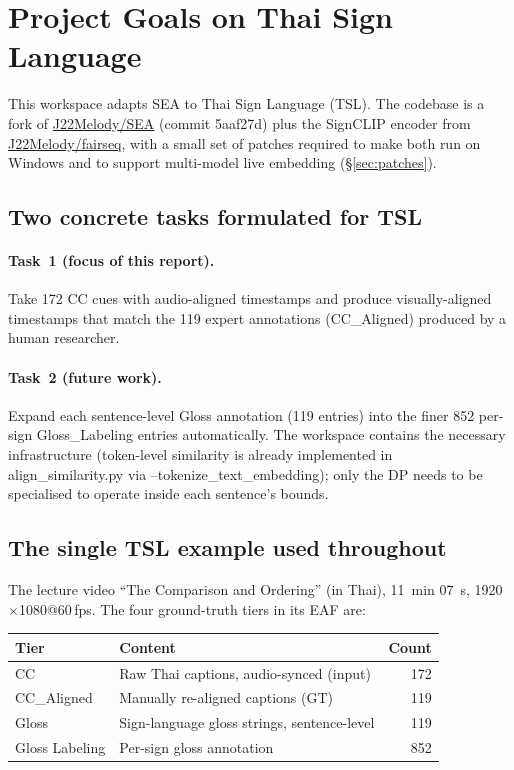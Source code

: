 \documentclass[11pt,a4paper]{article}
\def\texttt#1{#1}%
\def\textbf#1{#1}%
\def\emph#1{#1}%
\begin{document}
\section{Project Goals on Thai Sign Language}

This workspace adapts SEA to Thai Sign Language (TSL). The codebase is a fork
of \href{https://github.com/J22Melody/SEA}{J22Melody/SEA} (commit
\texttt{5aaf27d}) plus the SignCLIP encoder from
\href{https://github.com/J22Melody/fairseq}{J22Melody/fairseq}, with a small
set of patches required to make both run on Windows and to support multi-model
live embedding (\S\ref{sec:patches}).

\subsection{Two concrete tasks formulated for TSL}
\paragraph{Task~1 (focus of this report).} Take 172 CC cues with
audio-aligned timestamps and produce visually-aligned timestamps that match
the 119 expert annotations (\texttt{CC\_Aligned}) produced by a human
researcher.

\paragraph{Task~2 (future work).} Expand each sentence-level Gloss
annotation (119 entries) into the finer 852 per-sign \texttt{Gloss\_Labeling}
entries automatically. The workspace contains the necessary infrastructure
(token-level similarity is already implemented in
\texttt{align\_similarity.py} via \texttt{--tokenize\_text\_embedding}); only
the DP needs to be specialised to operate inside each sentence's bounds.

\subsection{The single TSL example used throughout}
The lecture video \emph{``The Comparison and Ordering''} (in Thai), 11~min
07~s, 1920$\times$1080@60\,fps. The four ground-truth tiers in its EAF are:

\begin{table}[h]
\centering
\small
\begin{tabularx}{\linewidth}{lXr}
\toprule
\textbf{Tier} & \textbf{Content} & \textbf{Count} \\
\midrule
\texttt{CC}             & Raw Thai captions, audio-synced (input)        & 172 \\
\texttt{CC\_Aligned}    & Manually re-aligned captions \emph{(GT)}       & 119 \\
\texttt{Gloss}          & Sign-language gloss strings, sentence-level    & 119 \\
\texttt{Gloss Labeling} & Per-sign gloss annotation                      & 852 \\
\bottomrule
\end{tabularx}
\end{table}
\end{document}
